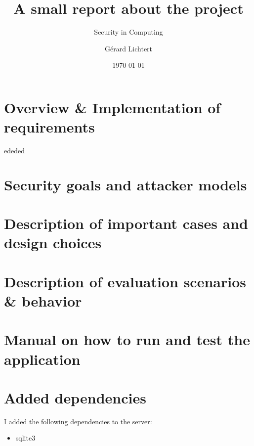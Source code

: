 \documentclass[a4paper]{article}
\title{A small report about the project}
\subtitle{Security in Computing}
\author{Gérard Lichtert}
\date{\today}
\begin{document}
\maketitle
\tableofcontents%
\newpage
\section{Overview \& Implementation of requirements}
ededed
\newpage
\section{Security goals and attacker models}

\newpage
\section{Description of important cases and design choices}

\newpage
\section{Description of evaluation scenarios \& behavior}

\newpage
\section{Manual on how to run and test the application}

\newpage
\section{Added dependencies}
I added the following dependencies to the server:
\begin{itemize}
    \item sqlite3
\end{itemize}
\end{document}
